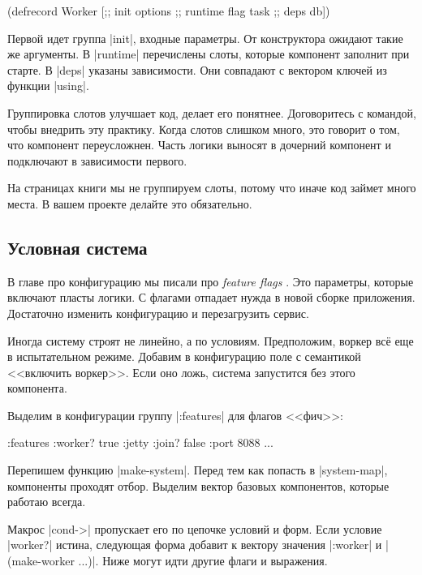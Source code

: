 \begin{english}
  \begin{clojure}
(defrecord Worker
    [;; init
     options
     ;; runtime
     flag
     task
     ;; deps
     db])
  \end{clojure}
\end{english}

Первой идет группа \spverb|init|, входные параметры. От конструктора ожидают
такие же аргументы. В \spverb|runtime| перечислены слоты, которые компонент
заполнит при старте. В \spverb|deps| указаны зависимости. Они совпадают с
вектором ключей из функции \spverb|using|.

Группировка слотов улучшает код, делает его понятнее. Договоритесь с командой,
чтобы внедрить эту практику. Когда слотов слишком много, это говорит о том, что
компонент переусложнен. Часть логики выносят в дочерний компонент и подключают в
зависимости первого.

На страницах книги мы не группируем слоты, потому что иначе код займет много
места. В вашем проекте делайте это обязательно.

\subsection{Условная система}

В главе про конфигурацию мы писали про \emph{feature flags} .
Это параметры, которые включают пласты логики. С флагами отпадает нужда в новой сборке
приложения. Достаточно изменить конфигурацию и перезагрузить сервис.

Иногда систему строят не линейно, а по условиям. Предположим, воркер
вс\"{е} еще в испытательном режиме. Добавим в конфигурацию поле с семантикой
<<включить воркер>>. Если оно ложь, система запустится без этого компонента.

Выделим в конфигурации группу \spverb|:features| для флагов <<фич>>:

\begin{english}
  \begin{clojure}
{:features {:worker? true}
 :jetty {:join? false :port 8088}
 ...}
  \end{clojure}
\end{english}

Перепишем функцию \spverb|make-system|. Перед тем как попасть в
\spverb|system-map|, компоненты проходят отбор. Выделим вектор базовых
компонентов, которые работаю всегда.

Макрос \spverb|cond->| пропускает его по цепочке условий и форм. Если условие
\spverb|worker?| истина, следующая форма добавит к вектору значения
\spverb|:worker| и \spverb|(make-worker {...})|. Ниже могут идти другие флаги и
выражения.

